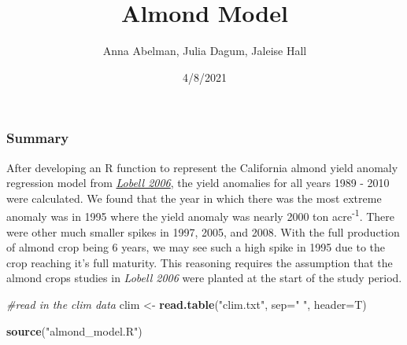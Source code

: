 \documentclass[
]{article}
\title{Almond Model}
\author{Anna Abelman, Julia Dagum, Jaleise Hall}
\date{4/8/2021}
\newenvironment{Shaded}{\begin{snugshade}}{\end{snugshade}}
\newcommand{\CommentTok}[1]{\textcolor[rgb]{0.56,0.35,0.01}{\textit{#1}}}
\newcommand{\DataTypeTok}[1]{\textcolor[rgb]{0.13,0.29,0.53}{#1}}
\newcommand{\KeywordTok}[1]{\textcolor[rgb]{0.13,0.29,0.53}{\textbf{#1}}}
\newcommand{\NormalTok}[1]{#1}
\newcommand{\OperatorTok}[1]{\textcolor[rgb]{0.81,0.36,0.00}{\textbf{#1}}}
\newcommand{\StringTok}[1]{\textcolor[rgb]{0.31,0.60,0.02}{#1}}
\begin{document}
\maketitle

\hypertarget{summary}{%
\subsubsection{Summary}\label{summary}}

After developing an R function to represent the California almond yield
anomaly regression model from
\href{https://gauchospace.ucsb.edu/courses/mod/resource/view.php?id=6782707}{\emph{Lobell
2006}}, the yield anomalies for all years 1989 - 2010 were calculated.
We found that the year in which there was the most extreme anomaly was
in 1995 where the yield anomaly was nearly 2000 ton
acre\textsuperscript{-1}. There were other much smaller spikes in 1997,
2005, and 2008. With the full production of almond crop being 6 years,
we may see such a high spike in 1995 due to the crop reaching it's full
maturity. This reasoning requires the assumption that the almond crops
studies in \emph{Lobell 2006} were planted at the start of the study
period.

\begin{Shaded}
\begin{Highlighting}[]
\CommentTok{#read in the clim data}
\NormalTok{clim <-}\StringTok{ }\KeywordTok{read.table}\NormalTok{(}\StringTok{"clim.txt"}\NormalTok{, }\DataTypeTok{sep=}\StringTok{" "}\NormalTok{, }\DataTypeTok{header=}\NormalTok{T)}

\KeywordTok{source}\NormalTok{(}\StringTok{"almond_model.R"}\NormalTok{)}
\end{Highlighting}
\end{Shaded}

\begin{Shaded}
\end{Shaded}
\end{document}
